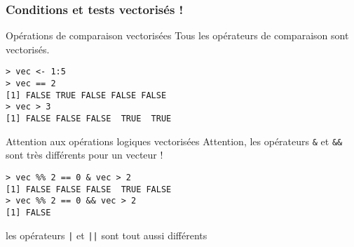 \documentclass[10pt]{beamer}
\begin{document}
\begin{frame}[fragile]
  \frametitle{Conditions et tests vectorisés !}
  \begin{block}{Opérations de comparaison vectorisées}
    Tous les opérateurs de comparaison sont vectorisés.  
  \begin{lstlisting}
> vec <- 1:5
> vec == 2
[1] FALSE TRUE FALSE FALSE FALSE
> vec > 3
[1] FALSE FALSE FALSE  TRUE  TRUE
\end{lstlisting}
\end{block}

\begin{alertblock}{Attention aux opérations logiques vectorisées}
  Attention, les opérateurs \texttt{\&} et \texttt{\&\&} sont très différents pour un vecteur !
 \begin{lstlisting}
> vec %% 2 == 0 & vec > 2
[1] FALSE FALSE FALSE  TRUE FALSE
> vec %% 2 == 0 && vec > 2
[1] FALSE    
\end{lstlisting}

les opérateurs \texttt{|} et \texttt{||} sont tout aussi différents
\end{alertblock}
\end{frame}
\end{document}
